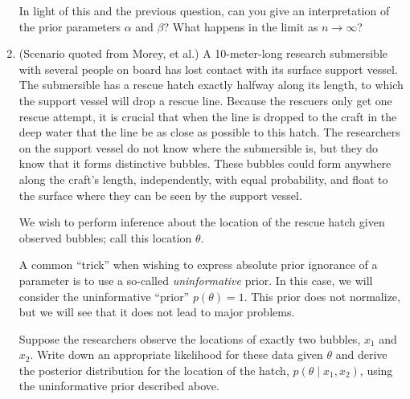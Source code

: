 \documentclass{article}
\newcommand{\given}{\mid}
\begin{document}
\begin{enumerate}
  In light of this and the previous question, can you give an
  interpretation of the prior parameters $\alpha$ and $\beta$?
  What happens in the limit as $n \to \infty$?

\item
  (Scenario quoted from Morey, et al.)  A 10-meter-long research
  submersible with several people on board has lost contact with its
  surface support vessel. The submersible has a rescue hatch exactly
  halfway along its length, to which the support vessel will drop a
  rescue line. Because the rescuers only get one rescue attempt, it is
  crucial that when the line is dropped to the craft in the deep water
  that the line be as close as possible to this hatch. The researchers
  on the support vessel do not know where the submersible is, but they
  do know that it forms distinctive bubbles. These bubbles could form
  anywhere along the craft's length, independently, with equal
  probability, and float to the surface where they can be seen by the
  support vessel.

  We wish to perform inference about the location of the rescue
  hatch given observed bubbles; call this location $\theta$.

  A common ``trick'' when wishing to express absolute prior ignorance
  of a parameter is to use a so-called \emph{uninformative} prior. In
  this case, we will consider the uninformative ``prior'' $p(\theta) =
  1$. This prior does not normalize, but we will see that it does not
  lead to major problems.

  Suppose the researchers observe the locations of exactly two
  bubbles, $x_1$ and $x_2$. Write down an appropriate likelihood for
  these data given $\theta$ and derive the posterior distribution for
  the location of the hatch, $p(\theta \given x_1, x_2)$, using the
  uninformative prior described above.

\end{enumerate}
\end{document}
